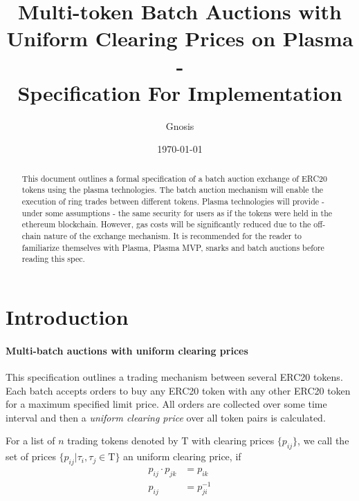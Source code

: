 \documentclass[11pt,parskip=full]{scrartcl}%
\title{
  Multi-token Batch Auctions with Uniform Clearing Prices on Plasma\\
  - \\
  \Large Specification For Implementation}
\author{Gnosis}
\date{\today}
\newcommand{\Tau}{\mathrm{T}}
\newcommand*{\erc}{ERC20 }
\begin{document}
\maketitle


\begin{abstract}

This document outlines a formal specification of a batch auction exchange of ERC20 tokens using the plasma technologies. 
The batch auction mechanism will enable the execution of ring trades between different tokens. 
Plasma technologies will provide - under some assumptions - the same security for users as if the tokens were held in the ethereum blockchain. 
However, gas costs will be significantly reduced due to the off-chain nature of the exchange mechanism. 
It is recommended for the reader to familiarize themselves with Plasma\cite{plasma}, Plasma MVP\cite{MVP}, snarks\cite{snarks} and batch auctions\cite{batch} before reading this spec. 

\end{abstract}

\tableofcontents

\newpage
\section{Introduction}
\label{sec:introduction}

\paragraph{Multi-batch auctions with uniform clearing prices}

This specification outlines a trading mechanism between several \erc tokens. Each batch accepts orders to buy any \erc token with any other \erc token for a maximum specified limit price. All orders are collected over some time interval and then a \emph{uniform clearing price} over all token pairs is calculated. 

For a list of $n$ trading tokens denoted by $\Tau$ with clearing prices $\{p_{ij}\}$, we call the set of prices $\{p_{ij}| \tau_i, \tau_j \in \Tau\}$ an uniform clearing price, if
\begin{align} \label{arbitrage_free}
  p_{ij} \cdot p_{jk} &= p_{ik}\\
  p_{ij} &= p_{ji}^{-1}
\end{align}
\end{document}
